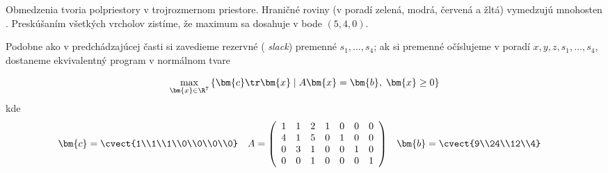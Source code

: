 \begin{minipage}[t]{0.4\textwidth}
  \vskip 0pt
\noindent
Obmedzenia tvoria polpriestory v trojrozmernom priestore. 
Hraničné roviny (v poradí zelená, modrá, červená a žltá)
vymedzujú mnohosten \dom.
Preskúšaním všetkých vrcholov \dom zistíme, že maximum
sa dosahuje v bode $(5,4,0)$. 
\end{minipage}\hfill
\begin{minipage}[t]{0.6\textwidth}
  \vskip 0pt

\begin{center}
  \end{center}
\end{minipage}

\noindent 
Podobne ako v predchádzajúcej časti si zavedieme rezervné ({\em
slack}) premenné $s_1,\ldots,s_4$;  ak si premenné očíslujeme v poradí $x,y,z,s_1,\ldots,s_4$,
dostaneme ekvivalentný program 
v normálnom tvare

$$\max_{\bm{x}\in\R^7}\left\{ \bm{c}\tr\bm{x} \mid A\bm{x}=\bm{b},\; \bm{x}\ge0
\right\}$$ 
%
kde
\begin{align*}
 \bm{c}&=\cvect{1\\1\\1\\0\\0\\0\\0}
&A&=\left(\begin{array}{ccccccc}
  1&1&2&1&0&0&0\\
  4&1&5&0&1&0&0\\
  0&3&1&0&0&1&0\\
  0&0&1&0&0&0&1
\end{array}\right)
&\bm{b}&=\cvect{9\\24\\12\\4}
\end{align*}

